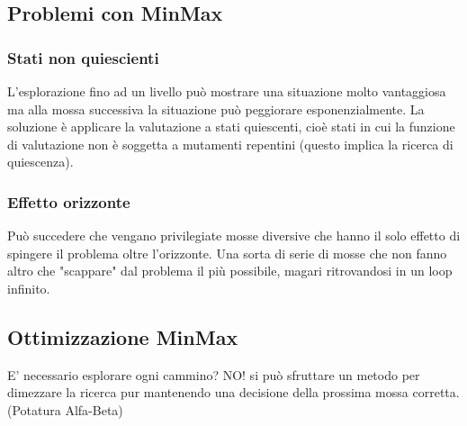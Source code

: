 \documentclass{article}
\begin{document}
\subsection{Problemi con MinMax}
\subsubsection{Stati non quiescienti}
L’esplorazione fino ad un livello può mostrare una situazione molto vantaggiosa ma alla mossa successiva la situazione può peggiorare esponenzialmente. La soluzione è applicare la valutazione a stati quiescenti, cioè stati in cui la funzione di valutazione non è soggetta a mutamenti repentini (questo implica la ricerca di quiescenza).
\subsubsection{Effetto orizzonte}
Può succedere che vengano privilegiate mosse diversive che hanno il solo effetto di spingere il problema oltre l’orizzonte. Una sorta di serie di mosse che non fanno altro che "scappare" dal problema il più possibile, magari ritrovandosi in un loop infinito.
\subsection{Ottimizzazione MinMax}
E' necessario esplorare ogni cammino? NO! si può sfruttare un metodo per dimezzare la ricerca pur mantenendo una decisione della prossima mossa corretta. (Potatura Alfa-Beta)
\end{document}
